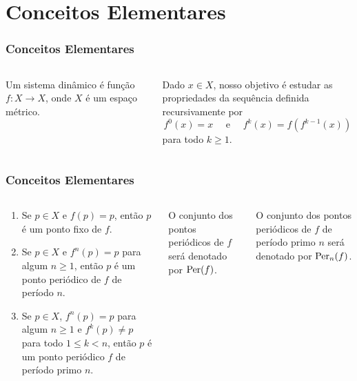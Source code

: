 \section{Conceitos Elementares}


\begin{frame}
\frametitle{Conceitos Elementares}
\begin{columns}
\column{\dimexpr\paperwidth-15pt}

\begin{definition}
Um sistema dinâmico é função $f: X \to X$, onde $X$ é um espaço métrico.
\end{definition}
\pause
Dado $x \in X$, nosso objetivo é estudar as propriedades da sequência definida recursivamente por
$$f^0(x) = x \quad \text{ e } \quad f^k(x) = f(f^{k-1}(x))$$
para todo $k \geq 1$.

\end{columns}
\end{frame}


\begin{frame}
\vspace{5pt}
\frametitle{Conceitos Elementares}      
\begin{columns}
\column{\dimexpr\paperwidth-15pt}

\begin{definition}
\begin{enumerate}
\item Se $p \in X$ e $f(p) = p$, então $p$ é um ponto fixo de $f$.

\item Se $p \in X$ e $f^n(p) = p$ para algum $n \geq 1$, então $p$ é um ponto periódico de $f$ de período $n$.

\item Se $p \in X$, $f^n(p) = p$ para algum $n \geq 1$ e $f^k(p) \neq p$ para todo $1 \leq k < n$, então $p$ é um ponto periódico $f$ de período primo $n$.
\end{enumerate}
\end{definition}
\pause
O conjunto dos pontos periódicos de $f$ será denotado por $\operatorname{Per}(f)$.

O conjunto dos pontos periódicos de $f$ de período primo $n$ será denotado por $\operatorname{Per}_n(f)$.

\end{columns}
\end{frame}


